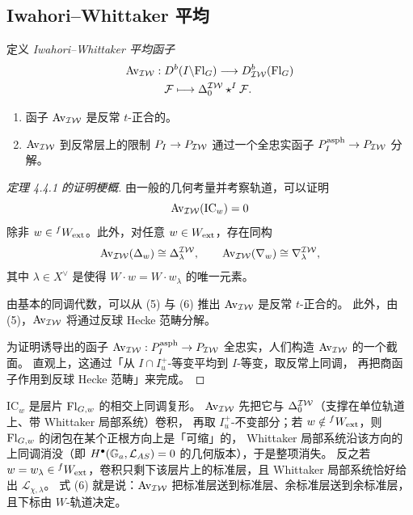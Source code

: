 \subsection{Iwahori–Whittaker 平均}\label{sec:av}

定义 \emph{Iwahori–Whittaker 平均函子}
\begin{align*}
\mathrm{Av}_{\mathcal{IW}}:\;&D^b(I\backslash\mathrm{Fl}_G)\longrightarrow D^b_{\mathcal{IW}}(\mathrm{Fl}_G)\\
&\mathcal{F}\longmapsto\Delta^{\mathcal{IW}}_0\star^{I}\mathcal{F} .
\end{align*}

\begin{theorem}\label{thm:av}
\begin{enumerate}[label=(\arabic*),leftmargin=2.2em,itemsep=1pt]
\item 函子 $\mathrm{Av}_{\mathcal{IW}}$ 是反常 $t$-正合的。
\item $\mathrm{Av}_{\mathcal{IW}}$ 到反常层上的限制 $P_I\to P_{\mathcal{IW}}$ 通过一个全忠实函子 $P_I^{\mathrm{asph}}\to P_{\mathcal{IW}}$ 分解。
\end{enumerate}
\end{theorem}

\begin{proof}[定理 4.4.1 的证明梗概]
由一般的几何考量并考察轨道，可以证明
\begin{equation}
\mathrm{Av}_{\mathcal{IW}}(\mathrm{IC}_w)=0
\end{equation}
除非 $w\in{}^{f}W_{\mathrm{ext}}$。此外，对任意 $w\in W_{\mathrm{ext}}$，存在同构
\begin{equation}
\mathrm{Av}_{\mathcal{IW}}(\Delta_w)\cong\Delta^{\mathcal{IW}}_\lambda,
\qquad
\mathrm{Av}_{\mathcal{IW}}(\nabla_w)\cong\nabla^{\mathcal{IW}}_\lambda,
\end{equation}
其中 $\lambda\in X^\vee$ 是使得 $W\cdot w=W\cdot w_\lambda$ 的唯一元素。

由基本的同调代数，可以从 (5) 与 (6) 推出 $\mathrm{Av}_{\mathcal{IW}}$ 是反常 $t$-正合的。
此外，由 (5)，$\mathrm{Av}_{\mathcal{IW}}$ 将通过反球 Hecke 范畴分解。

为证明诱导出的函子 $\mathrm{Av}_{\mathcal{IW}}:P_I^{\mathrm{asph}}\to P_{\mathcal{IW}}$ 全忠实，人们构造 $\mathrm{Av}_{\mathcal{IW}}$ 的一个截面。
直观上，这通过「从 $I\cap I^+_u$-等变平均到 $I$-等变，取反常上同调，
再把商函子作用到反球 Hecke 范畴」来完成。
\end{proof}

\begin{yizhu}
$\mathrm{IC}_w$ 是层片 $\mathrm{Fl}_{G,w}$ 的相交上同调复形。
$\mathrm{Av}_{\mathcal{IW}}$ 先把它与 $\Delta^{\mathcal{IW}}_0$（支撑在单位轨道上、带 Whittaker 局部系统）卷积，
再取 $I^+_u$-不变部分；若 $w\notin{}^{f}W_{\mathrm{ext}}$，则 $\mathrm{Fl}_{G,w}$ 的闭包在某个正根方向上是「可缩」的，
Whittaker 局部系统沿该方向的上同调消没（即 $H^\bullet(\mathbb{G}_a,\mathcal{L}_{AS})=0$ 的几何版本），于是整项消失。
反之若 $w=w_\lambda\in{}^{f}W_{\mathrm{ext}}$，卷积只剩下该层片上的标准层，且 Whittaker 局部系统恰好给出 $\mathcal{L}_{\chi,\lambda}$。
式 (6) 就是说：$\mathrm{Av}_{\mathcal{IW}}$ 把标准层送到标准层、余标准层送到余标准层，且下标由 $W$-轨道决定。
\end{yizhu}

